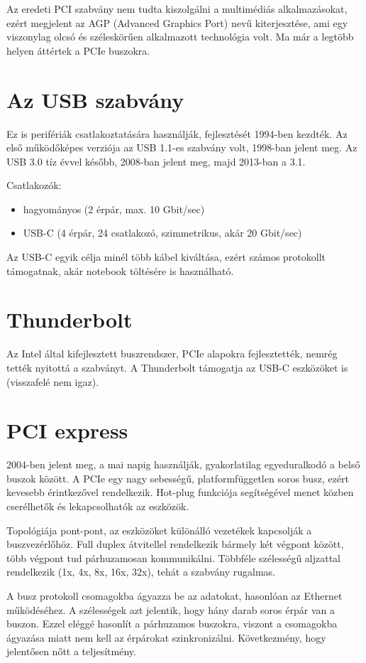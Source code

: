 Az eredeti PCI szabvány nem tudta kiszolgálni a multimédiás alkalmazásokat, ezért megjelent az AGP (Advanced Graphics Port) nevű kiterjesztése, ami egy viszonylag olcsó és széleskörűen alkalmazott technológia volt.
Ma már a legtöbb helyen áttértek a PCIe buszokra.

\section{Az USB szabvány}
Ez is perifériák csatlakoztatására használják, fejlesztését 1994-ben kezdték.
Az első működőképes verziója az USB 1.1-es szabvány volt, 1998-ban jelent meg.
Az USB 3.0 tíz évvel később, 2008-ban jelent meg, majd 2013-ban a 3.1.

Csatlakozók:
\begin{itemize}
    \item hagyományos (2 érpár, max. 10 Gbit/sec)
    \item USB-C (4 érpár, 24 csatlakozó, szimmetrikus, akár 20 Gbit/sec)
\end{itemize}

Az USB-C egyik célja minél több kábel kiváltása, ezért számos protokollt támogatnak, akár notebook töltésére is használható.

\section{Thunderbolt}
Az Intel által kifejlesztett buszrendszer, PCIe alapokra fejlesztették, nemrég tették nyitottá a szabványt.
A Thunderbolt támogatja az USB-C eszközöket is (visszafelé nem igaz).

\section{PCI express}
2004-ben jelent meg, a mai napig használják, gyakorlatilag egyeduralkodó a belső buszok között.
A PCIe egy nagy sebességű, platformfüggetlen soros busz, ezért kevesebb érintkezővel rendelkezik.
Hot-plug funkciója segítségével menet közben cserélhetők és lekapcsolhatók az eszközök.

Topológiája pont-pont, az eszközöket különálló vezetékek kapcsolják a buszvezérlőhöz.
Full duplex átvitellel rendelkezik bármely két végpont között, több végpont tud párhuzamosan kommunikálni.
Többféle szélességű aljzattal rendelkezik (1x, 4x, 8x, 16x, 32x), tehát a szabvány rugalmas.

A busz protokoll csomagokba ágyazza be az adatokat, hasonlóan az Ethernet működéséhez.
A szélességek azt jelentik, hogy hány darab soros érpár van a buszon.
Ezzel eléggé hasonlít a párhuzamos buszokra, viszont a csomagokba ágyazása miatt nem kell az érpárokat szinkronizálni.
Következmény, hogy jelentősen nőtt a teljesítmény.

